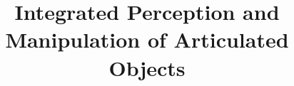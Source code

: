 \documentclass[10pt,twoside,a4paper]{article}
\begin{document}
\title{Integrated Perception and Manipulation of Articulated Objects}


\maketitle
\pagestyle{plain}



\pagestyle{fancy}


%




%



\end{document}
